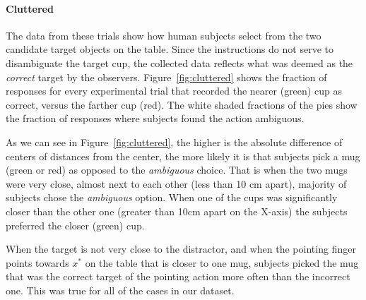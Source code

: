 \paragraph{Cluttered}
The data from these trials show how human subjects select from the two candidate target objects on the table. Since the instructions do not serve to disambiguate the target cup, the collected data reflects what was deemed as the \textit{correct} target by the observers. 
Figure~\ref{fig:cluttered} shows the fraction of responses for every experimental trial that recorded the nearer (green) cup as correct, versus the farther cup (red). The white shaded fractions of the pies show the fraction of responses where subjects found the action ambiguous.

As we can see in Figure~\ref{fig:cluttered}, the higher is the absolute difference of centers of distances from the center, the more likely it is that subjects pick a mug (green or red) as opposed to the \textit{ambiguous} choice. That is when the two mugs were very close, almost next to each other (less than 10 cm apart), majority of subjects chose the \textit{ambiguous} option. When one of the cups was significantly closer than the other one (greater than 10cm apart on the X-axis) the subjects preferred the closer (green) cup. 







When the target is not very close to the distractor, and when the pointing finger points towards $x^*$ on the table that is closer to one mug, subjects picked the mug that was the correct target of the pointing action more often than the incorrect one. This was true for all of the cases in our dataset. 


